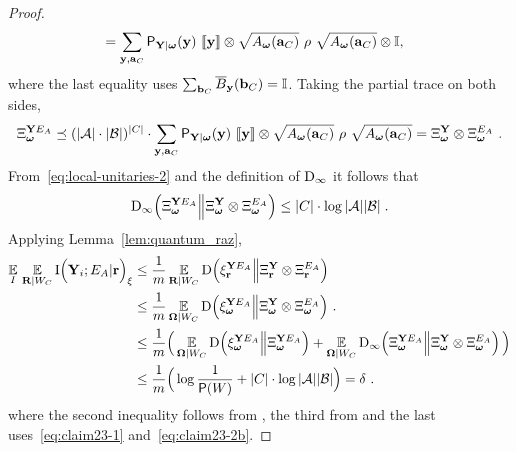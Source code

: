 \begin{proof}
\begin{align}
		&= \sum_{\mathbf{y}, \mathbf{a}_C} \mathsf{P}_{\mathbf{Y} | {\boldsymbol{\omega}}}(\mathbf{y}) \,\, \llbracket \mathbf{y} \rrbracket \otimes \sqrt{A_{\boldsymbol{\omega}}(\mathbf{a}_C)} \,\,\rho\,\, \sqrt{A_{\boldsymbol{\omega}}(\mathbf{a}_C)} \otimes \mathbb{I} \label{eq:claim23-2},
	\end{align}
where the last equality uses $\sum_{\mathbf{b}_C} \overline{B}_{\mathbf{y}}(\mathbf{b}_C) = \mathbb{I}$. Taking the partial trace on both sides,
\begin{align}
\label{eq:local-unitaries-2}
\Xi_{\boldsymbol{\omega}}^{\mathbf{Y} E_A} \preceq (|\mathcal{A}|\cdot |\mathcal{B}|)^{|C|} \cdot \sum_{\mathbf{y}, \mathbf{a}_C} \mathsf{P}_{\mathbf{Y} | {\boldsymbol{\omega}}}(\mathbf{y}) \,\, \llbracket \mathbf{y} \rrbracket \otimes \sqrt{A_{\boldsymbol{\omega}}(\mathbf{a}_C)} \,\,\rho\,\, \sqrt{A_{\boldsymbol{\omega}}(\mathbf{a}_C)} = \Xi_{{\boldsymbol{\omega}}}^{\mathbf{Y}} \otimes \Xi_{{\boldsymbol{\omega}}}^{E_A}~.
\end{align}
	From~\eqref{eq:local-unitaries-2} and the definition of $\mathrm{D}_\infty$ it follows that 
	\begin{equation}\label{eq:claim23-2b}
	\mathrm{D}_\infty \Big (\Xi_{{\boldsymbol{\omega}}}^{\mathbf{Y} E_A} \Big \| \Xi_{{\boldsymbol{\omega}}}^{\mathbf{Y}} \otimes \Xi_{{\boldsymbol{\omega}}}^{E_A} \Big ) \leq |C| \cdot \log |\mathcal{A}| |\mathcal{B}|\;.
	\end{equation}
Applying Lemma~\ref{lem:quantum_raz},
\begin{align*}
		\operatorname*{\mathbb{E}}_I \,  \operatorname*{\mathbb{E}}_{\mathbf{R} | W_C} \mathrm{I} \Big (\mathbf{Y}_i ; E_A | \mathbf{r} \Big )_{\xi} &\leq 		\frac{1}{m} \operatorname*{\mathbb{E}}_{\mathbf{R} | W_C} \mathrm{D} \Big (\xi_{\mathbf{r}}^{\mathbf{Y} E_A} \Big \| \Xi_{\mathbf{r}}^{\mathbf{Y}} \otimes \Xi_{\mathbf{r}}^{E_A} \Big )\notag\\
		&\leq \frac{1}{m} \operatorname*{\mathbb{E}}_{{\boldsymbol{\Omega}} | W_C} \mathrm{D} \Big (\xi_{{\boldsymbol{\omega}}}^{\mathbf{Y} E_A} \Big \| \Xi_{{\boldsymbol{\omega}}}^{\mathbf{Y}} \otimes \Xi_{{\boldsymbol{\omega}}}^{E_A} \Big )~.\notag \\
		&\leq 		\frac{1}{m} \Big(\operatorname*{\mathbb{E}}_{{\boldsymbol{\Omega}} | W_C} \mathrm{D} \Big (\xi_{{\boldsymbol{\omega}}}^{\mathbf{Y} E_A} \Big \| \Xi_{{\boldsymbol{\omega}}}^{\mathbf{Y} E_A} \Big) + \operatorname*{\mathbb{E}}_{{\boldsymbol{\Omega}} | W_C} \mathrm{D}_\infty \Big (\Xi_{{\boldsymbol{\omega}}}^{\mathbf{Y} E_A} \Big \| \Xi_{{\boldsymbol{\omega}}}^{\mathbf{Y}} \otimes \Xi_{{\boldsymbol{\omega}}}^{E_A} \Big) \, \Big)\notag\\
		&\leq \frac{1}{m}\Big(\log \frac{1}{\mathsf{P}(W)} +  |C| \cdot \log |\mathcal{A}| |\mathcal{B}|\Big) = \delta~.
\end{align*}
where the second inequality follows from , the third from  and the last uses~\eqref{eq:claim23-1} and~\eqref{eq:claim23-2b}. 
\end{proof}

